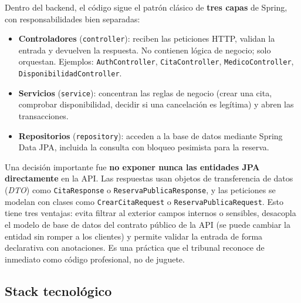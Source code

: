 \documentclass[12pt,a4paper]{report}
\begin{document}
Dentro del backend, el código sigue el patrón clásico de \textbf{tres capas} de Spring, con responsabilidades bien separadas:

\begin{itemize}
  \item \textbf{Controladores} (\texttt{controller}): reciben las peticiones HTTP, validan la entrada y devuelven la respuesta. No contienen lógica de negocio; solo orquestan. Ejemplos: \texttt{AuthController}, \texttt{CitaController}, \texttt{MedicoController}, \texttt{DisponibilidadController}.
  \item \textbf{Servicios} (\texttt{service}): concentran las reglas de negocio (crear una cita, comprobar disponibilidad, decidir si una cancelación es legítima) y abren las transacciones.
  \item \textbf{Repositorios} (\texttt{repository}): acceden a la base de datos mediante Spring Data JPA, incluida la consulta con bloqueo pesimista para la reserva.
\end{itemize}

Una decisión importante fue \textbf{no exponer nunca las entidades JPA directamente} en la API. Las respuestas usan objetos de transferencia de datos (\emph{DTO}) como \texttt{CitaResponse} o \texttt{ReservaPublicaResponse}, y las peticiones se modelan con clases como \texttt{CrearCitaRequest} o \texttt{ReservaPublicaRequest}. Esto tiene tres ventajas: evita filtrar al exterior campos internos o sensibles, desacopla el modelo de base de datos del contrato público de la API (se puede cambiar la entidad sin romper a los clientes) y permite validar la entrada de forma declarativa con anotaciones. Es una práctica que el tribunal reconoce de inmediato como código profesional, no de juguete.

\subsection{Stack tecnológico}
\end{document}
